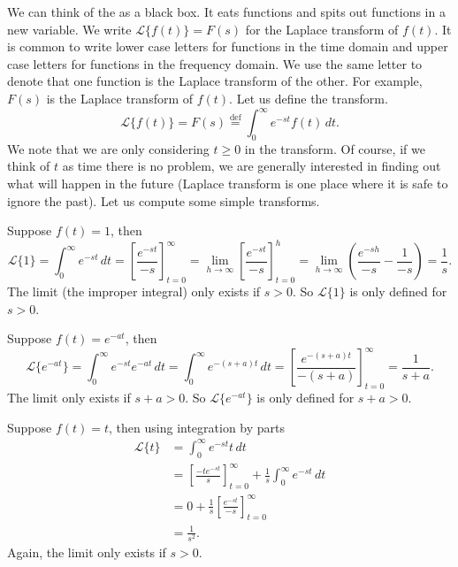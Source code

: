 \documentclass{ximera}
\begin{document}
We can think of the \emph{} as a black box.  It eats functions and spits out functions in a new variable.  We write $\mathcal{L} \bigl\{ f(t) \bigr\} = F(s)$ for the Laplace transform of $f(t)$. It is common to write lower case letters for functions in the time domain and upper case letters for functions in the frequency domain.  We use the same letter to denote that one function is the Laplace transform of the other.  For example, $F(s)$ is the Laplace transform of $f(t)$.  Let us define the transform.
\begin{equation*}
    \mathcal{L} \bigl\{ f(t) \bigr\} = F(s) \overset{\text{def}}{=} \int_0^\infty e^{-st} f(t) \, dt .
\end{equation*}
We note that we are only considering $t \geq 0$ in the transform.  Of course, if we think of $t$ as time there is no problem, we are generally interested in finding out what will happen in the future (Laplace transform is one place where it is safe to ignore the past).  Let us compute some simple transforms.

\begin{example}
    Suppose $f(t) = 1$, then
    \begin{equation*}
        \mathcal{L} \{1\} = \int_0^\infty e^{-st} \, dt
        = \left[ \frac{e^{-st}}{-s} \right]_{t=0}^\infty
        = \lim_{h\to\infty} \left[ \frac{e^{-st}}{-s} \right]_{t=0}^h
        = \lim_{h\to\infty} \left( \frac{e^{-sh}}{-s} - \frac{1}{-s} \right)
        = \frac{1}{s} .
    \end{equation*}
    The limit (the improper integral) only exists if $s > 0$.  So $\mathcal{L} \{1\}$ is only defined for $s > 0$.
\end{example}

\begin{example}
    Suppose $f(t) = e^{-at}$, then
    \begin{equation*}
        \mathcal{L} \bigl\{e^{-at}\bigr\}
        = \int_0^\infty e^{-st} e^{-at} \, dt
        = \int_0^\infty e^{-(s+a)t} \, dt
        = \left[ \frac{e^{-(s+a)t}}{-(s+a)} \right]_{t=0}^\infty
        = \frac{1}{s+a} .
    \end{equation*}
    The limit only exists if $s+a > 0$.  So $\mathcal{L} \bigl\{e^{-at}\bigr\}$ is only defined for $s+a > 0$.
\end{example}

\begin{example}
    Suppose $f(t) = t$, then using integration by parts
    \begin{equation*}
        \begin{split}
            \mathcal{L} \{t\} 
            & = \int_0^\infty e^{-st} t \, dt \\
            & = \left[ \frac{-te^{-st}}{s} \right]_{t=0}^\infty + \frac{1}{s} \int_0^\infty e^{-st} \,dt \\
            & = 0 + \frac{1}{s} \left[ \frac{e^{-st}}{-s} \right]_{t=0}^\infty \\
            & = \frac{1}{s^2} .
        \end{split}
    \end{equation*}
    Again, the limit only exists if $s > 0$.
\end{example}
\end{document}
